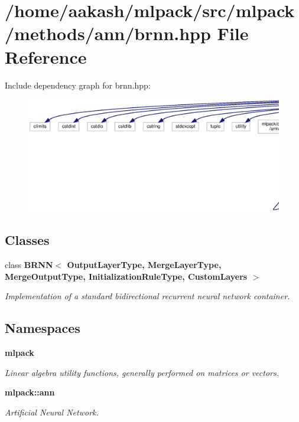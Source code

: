 \section{/home/aakash/mlpack/src/mlpack/methods/ann/brnn.hpp File Reference}
\label{brnn_8hpp}
Include dependency graph for brnn.\+hpp\+:
\nopagebreak
\begin{figure}[H]
\begin{center}
\leavevmode
\includegraphics[width=350pt]{brnn_8hpp__incl}
\end{center}
\end{figure}
\subsection*{Classes}
\begin{DoxyCompactItemize}
\item 
class \textbf{ B\+R\+N\+N$<$ Output\+Layer\+Type, Merge\+Layer\+Type, Merge\+Output\+Type, Initialization\+Rule\+Type, Custom\+Layers $>$}
\begin{DoxyCompactList}\small\item\em Implementation of a standard bidirectional recurrent neural network container. \end{DoxyCompactList}\end{DoxyCompactItemize}
\subsection*{Namespaces}
\begin{DoxyCompactItemize}
\item 
 \textbf{ mlpack}
\begin{DoxyCompactList}\small\item\em Linear algebra utility functions, generally performed on matrices or vectors. \end{DoxyCompactList}\item 
 \textbf{ mlpack\+::ann}
\begin{DoxyCompactList}\small\item\em Artificial Neural Network. \end{DoxyCompactList}\end{DoxyCompactItemize}


